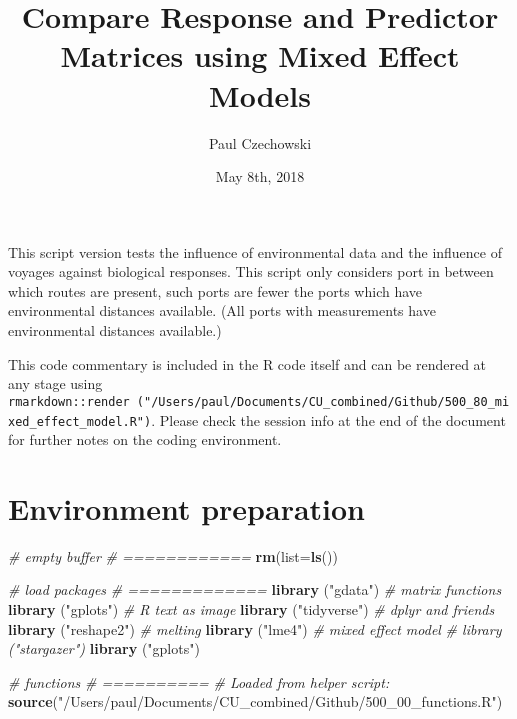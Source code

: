 \documentclass[]{article}
\title{Compare Response and Predictor Matrices using Mixed Effect Models}
\author{Paul Czechowski}
\date{May 8th, 2018}
\newenvironment{Shaded}{\begin{snugshade}}{\end{snugshade}}
\newcommand{\KeywordTok}[1]{\textcolor[rgb]{0.13,0.29,0.53}{\textbf{#1}}}
\newcommand{\DataTypeTok}[1]{\textcolor[rgb]{0.13,0.29,0.53}{#1}}
\newcommand{\StringTok}[1]{\textcolor[rgb]{0.31,0.60,0.02}{#1}}
\newcommand{\CommentTok}[1]{\textcolor[rgb]{0.56,0.35,0.01}{\textit{#1}}}
\newcommand{\NormalTok}[1]{#1}
\begin{document}
\maketitle

{
\setcounter{tocdepth}{3}
\tableofcontents
}
This script version tests the influence of environmental data and the
influence of voyages against biological responses. This script only
considers port in between which routes are present, such ports are fewer
the ports which have environmental distances available. (All ports with
measurements have environmental distances available.)

This code commentary is included in the R code itself and can be
rendered at any stage using
\texttt{rmarkdown::render\ ("/Users/paul/Documents/CU\_combined/Github/500\_80\_mixed\_effect\_model.R")}.
Please check the session info at the end of the document for further
notes on the coding environment.

\section{Environment preparation}\label{environment-preparation}

\begin{Shaded}
\begin{Highlighting}[]
\CommentTok{# empty buffer}
\CommentTok{# ============}
\KeywordTok{rm}\NormalTok{(}\DataTypeTok{list=}\KeywordTok{ls}\NormalTok{())}

\CommentTok{# load packages}
\CommentTok{# =============}
\KeywordTok{library}\NormalTok{ (}\StringTok{"gdata"}\NormalTok{)     }\CommentTok{# matrix functions}
\KeywordTok{library}\NormalTok{ (}\StringTok{"gplots"}\NormalTok{)    }\CommentTok{# R text as image}
\KeywordTok{library}\NormalTok{ (}\StringTok{"tidyverse"}\NormalTok{) }\CommentTok{# dplyr and friends}
\KeywordTok{library}\NormalTok{ (}\StringTok{"reshape2"}\NormalTok{)  }\CommentTok{# melting}
\KeywordTok{library}\NormalTok{ (}\StringTok{"lme4"}\NormalTok{)      }\CommentTok{# mixed effect model}
\CommentTok{# library ("stargazer")}
\KeywordTok{library}\NormalTok{ (}\StringTok{"gplots"}\NormalTok{)}


\CommentTok{# functions}
\CommentTok{# ==========}
\CommentTok{# Loaded from helper script:}
\KeywordTok{source}\NormalTok{(}\StringTok{"/Users/paul/Documents/CU_combined/Github/500_00_functions.R"}\NormalTok{)}
\end{Highlighting}
\end{Shaded}
\end{document}
